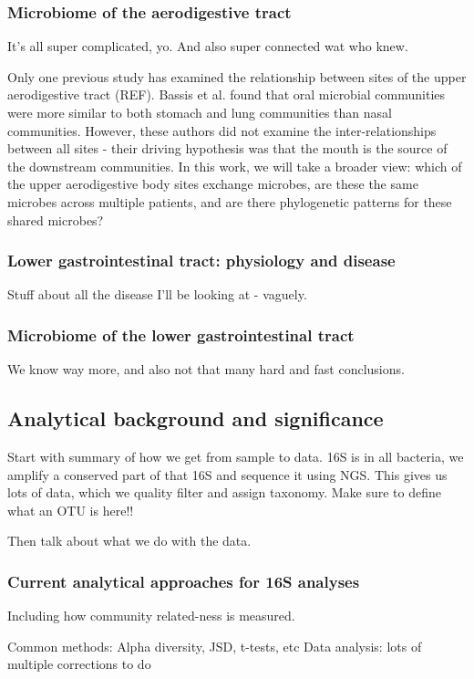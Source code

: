 \documentclass[12pt]{article}
\begin{document}
\subsubsection{Microbiome of the aerodigestive tract}
It's all super complicated, yo. And also super connected wat who knew.


Only one previous study has examined the relationship between sites of the upper aerodigestive tract (REF). Bassis et al. found that oral microbial communities were more similar to both stomach and lung communities than nasal communities. However, these authors did not examine the inter-relationships between all sites - their driving hypothesis was that the mouth is the source of the downstream communities. In this work, we will take a broader view: which of the upper aerodigestive body sites exchange microbes, are these the same microbes across multiple patients, and are there phylogenetic patterns for these shared microbes? 


\subsubsection{Lower gastrointestinal tract: physiology and disease}
Stuff about all the disease I'll be looking at - vaguely.

\subsubsection{Microbiome of the lower gastrointestinal tract}
We know way more, and also not that many hard and fast conclusions.

\subsection{Analytical background and significance}
Start with summary of how we get from sample to data.
16S is in all bacteria, we amplify a conserved part of that 16S and sequence it using NGS. This gives us lots of data, which we quality filter and assign taxonomy.
Make sure to define what an OTU is here!!

Then talk about what we do with the data.

\subsubsection{Current analytical approaches for 16S analyses}
Including how community related-ness is measured.

Common methods: Alpha diversity, JSD, t-tests, etc
Data analysis: lots of multiple corrections to do
\end{document}
